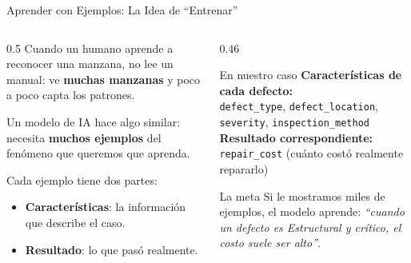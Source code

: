 \documentclass[aspectratio=169]{beamer}
\newcommand{\tech}[1]{\texttt{\textcolor{mainColor}{#1}}}
\begin{document}
\begin{frame}{Aprender con Ejemplos: La Idea de ``Entrenar''}
  \begin{columns}[T]
    \begin{column}{0.5\textwidth}
      \small
      Cuando un humano aprende a reconocer una manzana, no lee un manual: ve \textbf{muchas manzanas} y poco a poco capta los patrones.

      \vspace{0.2cm}
      Un modelo de IA hace algo similar: necesita \textbf{muchos ejemplos} del fenómeno que queremos que aprenda.

      \vspace{0.2cm}
      Cada ejemplo tiene dos partes:
      \begin{itemize}\setlength\itemsep{3pt}
        \item \textbf{Características}: la información que describe el caso.
        \item \textbf{Resultado}: lo que pasó realmente.
      \end{itemize}
    \end{column}
    \begin{column}{0.46\textwidth}
      \begin{conceptbox}{\faIndustry\enspace En nuestro caso}
        \small
        \textbf{Características de cada defecto:}\\[2pt]
        \tech{defect\_type}, \tech{defect\_location}, \tech{severity}, \tech{inspection\_method}\\[8pt]
        \textbf{Resultado correspondiente:}\\[2pt]
        \tech{repair\_cost} (cuánto costó realmente repararlo)
      \end{conceptbox}
      \vspace{0.15cm}
      \begin{alertblock}{\faLightbulb\enspace La meta}
        \small
        Si le mostramos miles de ejemplos, el modelo aprende: \textit{``cuando un defecto es Estructural y crítico, el costo suele ser alto''}.
      \end{alertblock}
    \end{column}
  \end{columns}
\end{frame}
\end{document}
